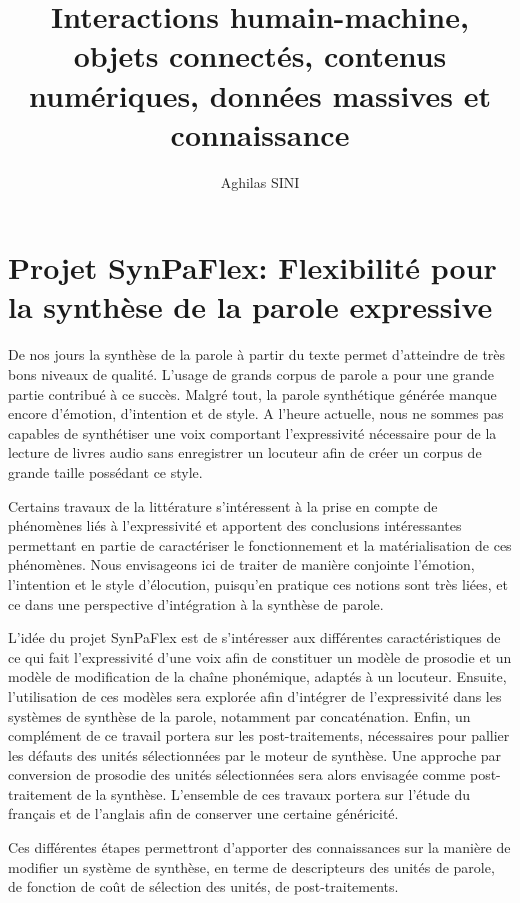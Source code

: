 \documentclass[12pt,a4paper]{article}
\author{Aghilas SINI}
\title{Interactions humain-machine, objets connectés, contenus numériques, données massives et connaissance}
\begin{document}
\maketitle


\section{Projet SynPaFlex: Flexibilité pour la synthèse de la parole expressive}
De nos jours la synthèse de la parole à partir du texte permet d’atteindre de très bons niveaux de qualité. L’usage de grands corpus de parole a pour une grande partie contribué à ce succès. Malgré tout, la parole synthétique générée manque encore d’émotion, d’intention et de style. A l’heure actuelle, nous ne sommes pas capables de synthétiser une voix comportant l’expressivité nécessaire pour de la lecture de livres audio sans enregistrer un locuteur afin de créer un corpus de grande taille possédant ce style. 

Certains travaux de la littérature s’intéressent à la prise en compte de phénomènes liés à l’expressivité et apportent des conclusions intéressantes permettant en partie de caractériser le fonctionnement et la matérialisation de ces phénomènes. Nous envisageons ici de traiter de manière conjointe l’émotion, l’intention et le style d’élocution, puisqu’en pratique ces notions sont très liées, et ce dans une perspective d’intégration à la synthèse de parole. 

L’idée du projet SynPaFlex est de s’intéresser aux différentes caractéristiques de ce qui fait l’expressivité d’une voix afin de constituer un modèle de prosodie et un modèle de modification de la chaîne phonémique, adaptés à un locuteur. Ensuite, l’utilisation de ces modèles sera explorée afin d’intégrer de l’expressivité dans les systèmes de synthèse de la parole, notamment par concaténation. Enfin, un complément de ce travail portera sur les post-traitements, nécessaires pour pallier les défauts des unités sélectionnées par le moteur de synthèse. Une approche par conversion de prosodie des unités sélectionnées sera alors envisagée comme post-traitement de la synthèse. L’ensemble de ces travaux portera sur l’étude du français et de l’anglais afin de conserver une certaine généricité. 

Ces différentes étapes permettront d’apporter des connaissances sur la manière de modifier un système de synthèse, en terme de descripteurs des unités de parole, de fonction de coût de sélection des unités, de post-traitements. 
\end{document}
